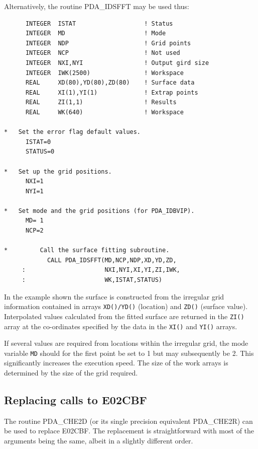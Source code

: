 \documentclass[11pt,twoside]{article}
\newcommand{\xlabel}[1]{}
\begin{document}
Alternatively, the routine PDA\_IDSFFT may be used thus:

\begin{verbatim}
      INTEGER  ISTAT                   ! Status
      INTEGER  MD                      ! Mode
      INTEGER  NDP                     ! Grid points
      INTEGER  NCP                     ! Not used
      INTEGER  NXI,NYI                 ! Output gird size
      INTEGER  IWK(2500)               ! Workspace
      REAL     XD(80),YD(80),ZD(80)    ! Surface data
      REAL     XI(1),YI(1)             ! Extrap points
      REAL     ZI(1,1)                 ! Results
      REAL     WK(640)                 ! Workspace

*   Set the error flag default values.
      ISTAT=0
      STATUS=0

*   Set up the grid positions.
      NXI=1
      NYI=1

*   Set mode and the grid positions (for PDA_IDBVIP).
      MD= 1
      NCP=2

*         Call the surface fitting subroutine.
            CALL PDA_IDSFFT(MD,NCP,NDP,XD,YD,ZD,
     :                      NXI,NYI,XI,YI,ZI,IWK,
     :                      WK,ISTAT,STATUS)
\end{verbatim}

In the example shown the surface is constructed from the irregular grid
information contained in arrays {\tt XD()/YD()} (location) and
{\tt ZD()} (surface value). Interpolated values calculated from the
fitted surface are returned in the {\tt ZI()} array at the co-ordinates
specified by the data in the {\tt XI()} and {\tt YI()} arrays.

If several values are required from locations within the
irregular grid, the mode variable {\tt MD} should for the first
point be set to 1 but may subsequently be 2. This
significantly increases the execution speed. The size of the work
arrays is determined by the size of the grid required.

\subsection{\xlabel{replacing_calls_to_e02cbf}Replacing calls to E02CBF}
The routine PDA\_CHE2D (or its single precision equivalent PDA\_CHE2R)
can be used to replace E02CBF. The replacement is straightforward with most
of the arguments being the same, albeit in a slightly different order.

\end{document}
